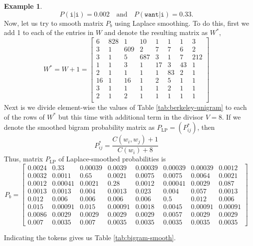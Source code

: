 \documentclass[
  12pt,
  a4paper]{article}
\theoremstyle{definition}
\theoremstyle{definition}
\newtheorem{example}{Example}[section]
\theoremstyle{definition}
\theoremstyle{definition}
\theoremstyle{remark}
\begin{document}
\begin{example}
\[P(\texttt{i}|\texttt{i}) = 0.002\quad \text{and} \quad P(\texttt{want}|\texttt{i}) = 0.33.\]
Now, let us try to smooth matrix \(P_b\) using Laplace smoothing. To do this, first we add 1 to each of the entries in \(W\) and denote the resulting matrix as \(W^*\),
\[
W^* = W + 1 
= 
\left[
\begin{array}{rrrrrrrr}
    6 & 828 &   1 &  10 &   1 &   1 &   1 &   3 \\ 
    3 &   1 & 609 &   2 &   7 &   7 &   6 &   2 \\ 
    3 &   1 &   5 & 687 &   3 &   1 &   7 & 212 \\ 
    1 &   1 &   3 &   1 &  17 &   3 &  43 &   1 \\ 
    2 &   1 &   1 &   1 &   1 &  83 &   2 &   1 \\ 
   16 &   1 &  16 &   1 &   2 &   5 &   1 &   1 \\ 
    3 &   1 &   1 &   1 &   1 &   2 &   1 &   1 \\ 
    2 &   1 &   2 &   1 &   1 &   1 &   1 &   1 \\ 
\end{array}
\right]
\]
Next is we divide element-wise the values of Table \ref{tab:berkeley-unigram} to each of the rows of \(W^*\) but this time with additional term in the divisor \(V=8\). If we denote the smoothed bigram probability matrix as \(P_{\text{LP}} = (P^*_{ij})\), then
\[
P^*_{ij} = \frac{C(w_i,w_j) + 1}{C(w_i) + 8}
\]
Thus, matrix \(P_{\text{LP}}\) of Laplace-smoothed probabilities is
\[
P_b 
=
\begin{bmatrix}
  0.0024 & 0.33 & 0.00039 & 0.0039 & 0.00039 & 0.00039 & 0.00039 & 0.0012 \\ 
  0.0032 & 0.0011 & 0.65 & 0.0021 & 0.0075 & 0.0075 & 0.0064 & 0.0021 \\ 
  0.0012 & 0.00041 & 0.0021 & 0.28 & 0.0012 & 0.00041 & 0.0029 & 0.087 \\ 
  0.0013 & 0.0013 & 0.004 & 0.0013 & 0.023 & 0.004 & 0.057 & 0.0013 \\ 
  0.012 & 0.006 & 0.006 & 0.006 & 0.006 & 0.5 & 0.012 & 0.006 \\ 
  0.015 & 0.00091 & 0.015 & 0.00091 & 0.0018 & 0.0045 & 0.00091 & 0.00091 \\ 
  0.0086 & 0.0029 & 0.0029 & 0.0029 & 0.0029 & 0.0057 & 0.0029 & 0.0029 \\ 
  0.007 & 0.0035 & 0.007 & 0.0035 & 0.0035 & 0.0035 & 0.0035 & 0.0035
  \end{bmatrix}
\]

Indicating the tokens gives us Table \ref{tab:bigram-smooth}.


\end{example}
\end{document}
